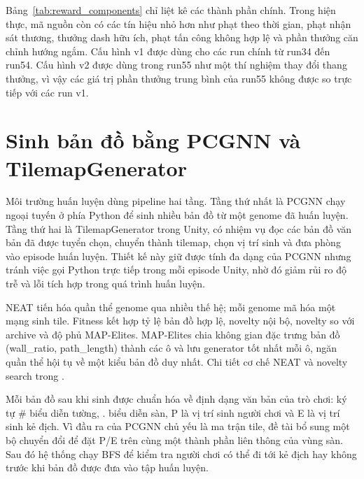 Bảng~\ref{tab:reward_components} chỉ liệt kê các thành phần chính. Trong hiện thực, mã nguồn còn có các tín hiệu nhỏ hơn như phạt theo thời gian, phạt nhận sát thương, thưởng dash hữu ích, phạt tấn công không hợp lệ và phần thưởng căn chỉnh hướng ngắm. Cấu hình v1 được dùng cho các run chính từ run34 đến run54. Cấu hình v2 được dùng trong run55 như một thí nghiệm thay đổi thang thưởng, vì vậy các giá trị phần thưởng trung bình của run55 không được so trực tiếp với các run v1.

\section{Sinh bản đồ bằng PCGNN và TilemapGenerator}

Môi trường huấn luyện dùng pipeline hai tầng. Tầng thứ nhất là PCGNN chạy ngoại tuyến ở phía Python để sinh nhiều bản đồ từ một genome đã huấn luyện. Tầng thứ hai là TilemapGenerator trong Unity, có nhiệm vụ đọc các bản đồ văn bản đã được tuyển chọn, chuyển thành tilemap, chọn vị trí sinh và đưa phòng vào episode huấn luyện. Thiết kế này giữ được tính đa dạng của PCGNN nhưng tránh việc gọi Python trực tiếp trong mỗi episode Unity, nhờ đó giảm rủi ro độ trễ và lỗi tích hợp trong quá trình huấn luyện.

NEAT tiến hóa quần thể genome qua nhiều thế hệ; mỗi genome mã hóa một mạng sinh tile. Fitness kết hợp tỷ lệ bản đồ hợp lệ, novelty nội bộ, novelty so với archive và độ phủ MAP-Elites. MAP-Elites chia không gian đặc trưng bản đồ (wall\_ratio, path\_length) thành các ô và lưu generator tốt nhất mỗi ô, ngăn quần thể hội tụ về một kiểu bản đồ duy nhất. Chi tiết cơ chế NEAT và novelty search trong \cite{Beukman2022}.


Mỗi bản đồ sau khi sinh được chuẩn hóa về định dạng văn bản của trò chơi: ký tự \# biểu diễn tường, . biểu diễn sàn, P là vị trí sinh người chơi và E là vị trí sinh kẻ địch. Vì đầu ra của PCGNN chủ yếu là ma trận tile, đề tài bổ sung một bộ chuyển đổi để đặt P/E trên cùng một thành phần liên thông của vùng sàn. Sau đó hệ thống chạy BFS để kiểm tra người chơi có thể đi tới kẻ địch hay không trước khi bản đồ được đưa vào tập huấn luyện.

